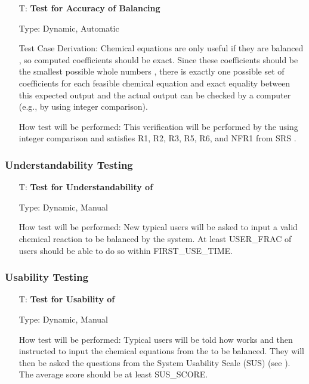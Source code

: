 \documentclass[12pt, titlepage]{article}
\newcounter{testnum} %
\begin{document}
\begin{enumerate}

  \item[T\refstepcounter{testnum}\thetestnum \label{test_bal_accuracy}:]
    \textbf{Test for Accuracy of Balancing}

    Type: Dynamic, Automatic

    Test Case Derivation: Chemical equations are only useful if they are
    balanced \cite{lund_introduction_2023}, so computed coefficients should be
    exact. Since these coefficients should be the smallest possible whole
    numbers \cite{lund_introduction_2023}, there is exactly one possible set of
    coefficients for each feasible chemical equation and exact equality between
    this expected output and the actual output can be checked by a computer
    (e.g., by using integer comparison).

    How test will be performed: This verification will be performed by
    the  using integer comparison and satisfies R1, R2,
    R3, R5, R6, and NFR1 from SRS .

\end{enumerate}

\subsubsection{Understandability Testing}

\begin{enumerate}

  \item[T\refstepcounter{testnum}\thetestnum \label{test_understand}:]
    \textbf{Test for Understandability of \progname{}}

    Type: Dynamic, Manual

    How test will be performed: New typical users will be asked to input a
    valid chemical reaction to be balanced by the system. At least
    USER\_FRAC of users should be able to do so within
    FIRST\_USE\_TIME.

\end{enumerate}

\subsubsection{Usability Testing}

\begin{enumerate}

  \item[T\refstepcounter{testnum}\thetestnum \label{test_usable}:]
    \textbf{Test for Usability of \progname{}}

    Type: Dynamic, Manual

    How test will be performed: Typical users will be told how \progname{}
    works and then instructed to input the chemical equations from the
     to be balanced. They will then be asked the
    questions from the System Usability Scale (SUS) \cite{thomas_how_2015}
    (see ). The average score should be at least
    SUS\_SCORE.

\end{enumerate}
\end{document}
